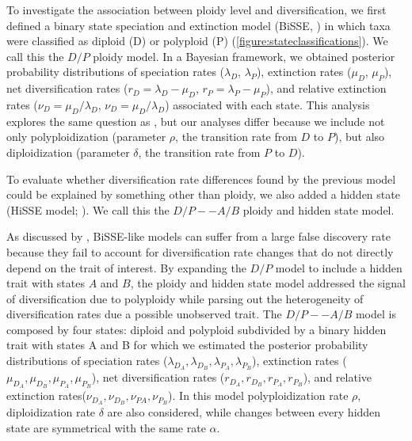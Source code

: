 To investigate the association between ploidy level and diversification, we first defined a binary state speciation and extinction model (BiSSE, \citealt{maddison_2007}) in which taxa were classified as diploid (D) or polyploid (P) (\cref{figure:stateclassifications}).
We call this the $D/P$ ploidy model. 
In a Bayesian framework, we obtained posterior probability distributions of speciation rates ($\lambda_D$, $\lambda_P$), extinction rates ($\mu_D$, $\mu_P$), net diversification rates ($r_D=\lambda_D-\mu_D$, $r_P=\lambda_P-\mu_P$), and relative extinction rates ($\nu_D=\mu_D / \lambda_D$, $\nu_D=\mu_D / \lambda_D$) associated with each state.
This analysis explores the same question as \citet{mayrose_2011, mayrose_2015}, but our analyses differ because we include not only polyploidization (parameter $\rho$, the transition rate from $D$ to $P$), but also diploidization (parameter $\delta$, the transition rate from $P$ to $D$). %

To evaluate whether diversification rate differences found by the previous model could be explained by something other than ploidy, we also added a hidden state (HiSSE model; \citet{beaulieu_2016}).
We call this the $D/P--A/B$ ploidy and hidden state model. 

As discussed by \citet{rabosky_2015, beaulieu_2016}, BiSSE-like models can suffer from a large false discovery rate because they fail to account for diversification rate changes that do not directly depend on the trait of interest.
By expanding the $D/P$ model to include a hidden trait with states $A$ and $B$, the ploidy and hidden state model addressed the signal of diversification due to polyploidy while parsing out the heterogeneity of diversification rates due a possible unobserved trait.
The $D/P--A/B$ model is composed by four states: diploid and polyploid subdivided by a binary hidden trait with states A and B for which we estimated the posterior probability distributions of speciation rates ($\lambda_{D_A},\lambda_{D_B}, \lambda_{P_A},\lambda_{P_B}$), extinction rates ($\mu_{D_A},\mu_{D_B}, \mu_{P_A},\mu_{P_B}$),  net diversification rates ($r_{D_A},r_{D_B},r_{P_A},r_{P_B}$), and relative extinction rates($\nu_{D_A},\nu_{D_B}, \nu_{PA},\nu_{P_B}$). In this model polyploidization rate $\rho$, diploidization rate $\delta$ are also considered, while changes between every hidden state are symmetrical with the same rate $\alpha$.

